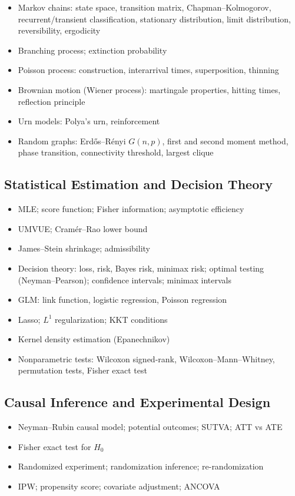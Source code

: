 \begin{itemize}
  \item Markov chains: state space, transition matrix, Chapman--Kolmogorov, recurrent/transient classification, stationary distribution, limit distribution, reversibility, ergodicity
  \item Branching process; extinction probability
  \item Poisson process: construction, interarrival times, superposition, thinning
  \item Brownian motion (Wiener process): martingale properties, hitting times, reflection principle
  \item Urn models: Polya's urn, reinforcement
  \item Random graphs: Erd\H{o}s--R\'enyi $G(n,p)$, first and second moment method, phase transition, connectivity threshold, largest clique
\end{itemize}

\subsection{Statistical Estimation and Decision Theory}

\begin{itemize}
  \item MLE; score function; Fisher information; asymptotic efficiency
  \item UMVUE; Cram\'er--Rao lower bound
  \item James--Stein shrinkage; admissibility
  \item Decision theory: loss, risk, Bayes risk, minimax risk; optimal testing (Neyman--Pearson); confidence intervals; minimax intervals
  \item GLM: link function, logistic regression, Poisson regression
  \item Lasso; $L^1$ regularization; KKT conditions
  \item Kernel density estimation (Epanechnikov)
  \item Nonparametric tests: Wilcoxon signed-rank, Wilcoxon--Mann--Whitney, permutation tests, Fisher exact test
\end{itemize}

\subsection{Causal Inference and Experimental Design}

\begin{itemize}
  \item Neyman--Rubin causal model; potential outcomes; SUTVA; ATT vs ATE
  \item Fisher exact test for $H_0$
  \item Randomized experiment; randomization inference; re-randomization
  \item IPW; propensity score; covariate adjustment; ANCOVA
\end{itemize}

